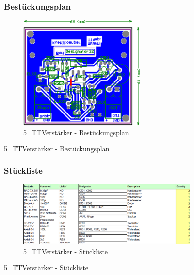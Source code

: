 \begin{figure}
	\subsubsection*{Bestückungsplan}
	\begin{figure} [H]
		\centering
		\includegraphics[width=0.7\textwidth]{img/Print5/5_TTVerstaerker-Best.png}
		\caption{5\_TTVerstärker - Bestückungsplan}
		\label {fig:8.10.17}
	\end{figure}
\end{figure}

\begin{figure}
	\subsubsection*{Stückliste}
	\begin{figure} [H]
		\centering
		\includegraphics[width=1\textwidth]{img/Print5/5_TTVerstaerker-Blist.png}
		\caption{5\_TTVerstärker - Stückliste}
		\label {fig:8.10.18}
	\end{figure}
\end{figure}


